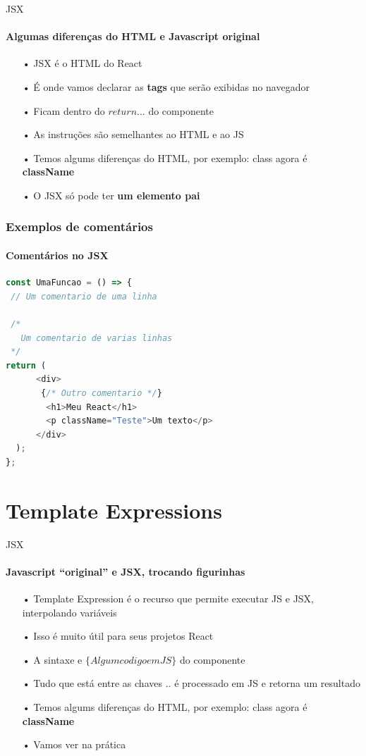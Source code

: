\documentclass[13pt, xcolor={dvipsnames,svgnames}, portuguese]{beamer}
\begin{document}
\begin{frame}{JSX}
\framesubtitle{Algumas diferenças do HTML e Javascript original}
\begin{itemize}
	\item[•] JSX é o HTML do React
	\pause
	\item[•] É onde vamos declarar as \textbf{tags} que serão exibidas no navegador
	\pause
	\item[•] Ficam dentro do $return {  ... }$ do componente
	\pause
	\item[•] As instruções são semelhantes ao HTML e ao JS
	\pause
	\item[•] Temos algums diferenças do HTML, por exemplo: class agora é \textbf{className}
	\item[•] O JSX só pode ter \textbf{um elemento pai}
	
\end{itemize}
\end{frame}


%
\begin{frame}[fragile]
\frametitle{Exemplos de comentários}
\framesubtitle{Comentários no JSX}

\begin{lstlisting}[language=JavaScript]
const UmaFuncao = () => {
 // Um comentario de uma linha
 
 /*
   Um comentario de varias linhas
 */
return (
      <div>
       {/* Outro comentario */}
        <h1>Meu React</h1>
        <p className="Teste">Um texto</p>
      </div>
  );
};
\end{lstlisting}
\end{frame}

\section{Template Expressions}
\begin{frame}{JSX}
\framesubtitle{Javascript ``original'' e JSX, trocando figurinhas}
\begin{itemize}
	\item[•] Template Expression é o recurso que permite executar JS e JSX, interpolando variáveis
	\pause
	\item[•] Isso é muito útil para seus projetos React
	\pause
	\item[•] A sintaxe e $\{Algum codigo em JS \}$ do componente
	\pause
	\item[•] Tudo que está entre as chaves ${..}$ é processado em JS e retorna um resultado
	\pause
	\item[•] Temos algums diferenças do HTML, por exemplo: class agora é \textbf{className}
	\item[•] Vamos ver na prática
\end{itemize}
\end{frame}
\end{document}
